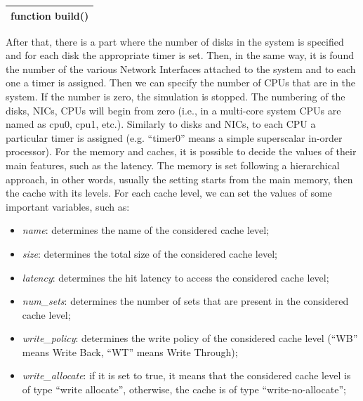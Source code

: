 \documentclass[a4paper]{article}
\begin{document}
\begin{flushleft}
\tablehead{}
\begin{supertabular}{|m{6.29346in}|}
\hline
{}\ttfamily function build()\\\hline
\end{supertabular}
\end{flushleft}
{
After that, there is a part where the number of disks in the system is
specified and for each disk the appropriate timer is set. Then, in the
same way, it is found the number of the various Network Interfaces
attached to the system and to each one a timer is assigned. Then we can
specify the number of CPUs that are in the system. If the number is
zero, the simulation is stopped. The numbering of the disks, NICs, CPUs
will begin from zero (i.e., in a multi-core system CPUs are named as
cpu0, cpu1, etc.). Similarly to disks and NICs, to each CPU a
particular timer is assigned (e.g.
{\textquotedblleft}timer0{\textquotedblright} means a simple
superscalar in-order processor). For the memory and caches, it is
possible to decide the values of their main features, such as the
latency. The memory is set following a hierarchical approach, in other
words, usually the setting starts from the main memory, then the cache
with its levels. For each cache level, we can set the values of some
important variables, such as:}

\begin{itemize}
\item {
\textit{name}: determines the name of the considered cache level;}
\item {
\textit{size}: determines the total size of the considered cache level;}
\item {
\textit{latency}: determines the hit latency to access the considered
cache level;}
\item {
\textit{num\_sets}: determines the number of sets that are present in
the considered cache level;}
\end{itemize}
\begin{itemize}
\item {
\textit{write\_policy}: determines the write policy of the considered
cache level ({\textquotedblleft}WB{\textquotedblright} means Write
Back, {\textquotedblleft}WT{\textquotedblright} means Write Through);}
\item {
\textit{write\_allocate}: if it is set to true, it means that the
considered cache level is of type {\textquotedblleft}write
allocate{\textquotedblright}, otherwise, the cache is of type
{\textquotedblleft}write-no-allocate{\textquotedblright};}
\end{itemize}
\end{document}
